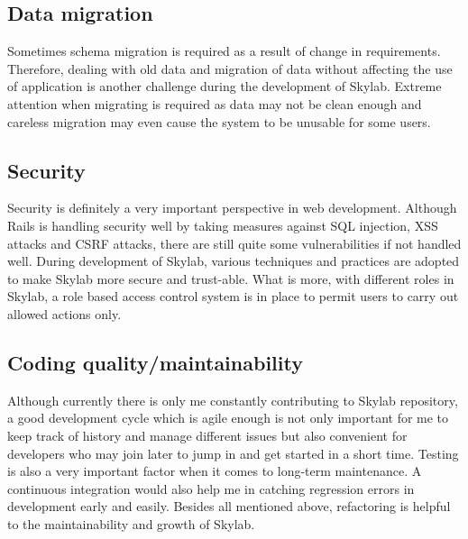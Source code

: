 \subsection{Data migration}
Sometimes schema migration is required as a result of change in requirements. Therefore, dealing with old data and migration of data without affecting the use of application is another challenge during the development of Skylab. Extreme attention when migrating is required as data may not be clean enough and careless migration may even cause the system to be unusable for some users.

\subsection{Security}
Security is definitely a very important perspective in web development. Although Rails is handling security well by taking measures against SQL injection, XSS attacks and CSRF attacks, there are still quite some vulnerabilities if not handled well. During development of Skylab, various techniques and practices are adopted to make Skylab more secure and trust-able. What is more, with different roles in Skylab, a role based access control system is in place to permit users to carry out allowed actions only.

\subsection{Coding quality/maintainability}
Although currently there is only me constantly contributing to Skylab repository, a good development cycle which is agile enough is not only important for me to keep track of history and manage different issues but also convenient for developers who may join later to jump in and get started in a short time. Testing is also a very important factor when it comes to long-term maintenance. A continuous integration would also help me in catching regression errors in development early and easily. Besides all mentioned above, refactoring is helpful to the maintainability and growth of Skylab.



